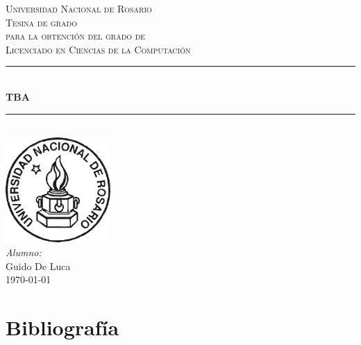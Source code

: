 \documentclass[a4paper]{book}
\begin{document}
\begin{titlepage}

\newcommand{\HRule}{\rule{\linewidth}{0.5mm}}  %

\center

\textsc{\LARGE Universidad Nacional de Rosario} \\[1cm]

\textsc{\Large Tesina de grado}\\[0.1cm]
\textsc{\large para la obtención del grado de}\\[0.1cm]
\textsc{\large Licenciado en Ciencias de la Computación}\\[1cm]

\HRule \\[0.8cm]
{ \huge \bfseries TBA}\\[0.7cm]        %
\HRule \\[2cm]

\large
\includegraphics[width=0.3\textwidth]{imagenes/unr.jpg}\\[3cm] 	%
\emph{Alumno:}\\
Guido De Luca \\[1.5cm]													%
{\large \today}\\[2cm]
\vfill
\end{titlepage}

\tableofcontents



\chapter*{Bibliografía}
\label{chapter:bib}
\printbibliography[heading=none]
\end{document}
